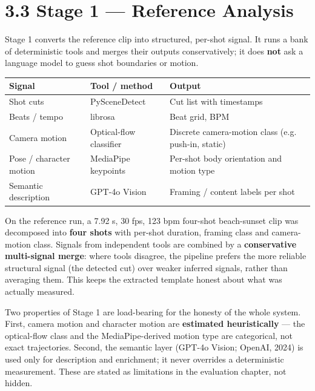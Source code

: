 \documentclass[10pt,twocolumn,letterpaper]{article}
\begin{document}

\section*{3.3 Stage 1 --- Reference Analysis}

Stage 1 converts the reference clip into structured, per-shot signal. It runs a bank of deterministic tools and merges their outputs conservatively; it does \textbf{not} ask a language model to guess shot boundaries or motion.

\begin{table}[t]
\centering
\footnotesize
\begin{tabularx}{\textwidth}{>{\RaggedRight\arraybackslash}X>{\RaggedRight\arraybackslash}X>{\RaggedRight\arraybackslash}X}
\toprule
Signal & Tool / method & Output \\
\midrule
Shot cuts & PySceneDetect & Cut list with timestamps \\
Beats / tempo & librosa & Beat grid, BPM \\
Camera motion & Optical-flow classifier & Discrete camera-motion class (e.g. push-in, static) \\
Pose / character motion & MediaPipe keypoints & Per-shot body orientation and motion type \\
Semantic description & GPT-4o Vision & Framing / content labels per shot \\
\bottomrule
\end{tabularx}
\end{table}

On the reference run, a 7.92 s, 30 fps, 123 bpm four-shot beach-sunset clip was decomposed into \textbf{four shots} with per-shot duration, framing class and camera-motion class. Signals from independent tools are combined by a \textbf{conservative multi-signal merge}: where tools disagree, the pipeline prefers the more reliable structural signal (the detected cut) over weaker inferred signals, rather than averaging them. This keeps the extracted template honest about what was actually measured.

Two properties of Stage 1 are load-bearing for the honesty of the whole system. First, camera motion and character motion are \textbf{estimated heuristically} --- the optical-flow class and the MediaPipe-derived motion type are categorical, not exact trajectories. Second, the semantic layer (GPT-4o Vision; OpenAI, 2024) is used only for description and enrichment; it never overrides a deterministic measurement. These are stated as limitations in the evaluation chapter, not hidden.
\end{document}
